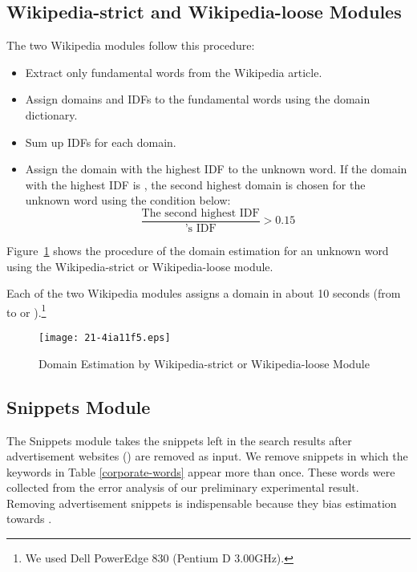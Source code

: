 \documentclass[english]{jnlp_1.4_rep}
\newcommand{\dom}[1]{}
\newcommand{\BAngou}[1]{}
\newcommand{\BANgou}[1]{}
\begin{document}
\subsection{Wikipedia-strict and Wikipedia-loose Modules}
\label{wikipedia}

The two Wikipedia modules follow this procedure:
\begin{itemize}
 \item[\BANgou{1}] Extract only fundamental words from the Wikipedia
	    article.
 \item[\BANgou{2}] Assign domains and IDFs to the fundamental words
	    using the domain dictionary. 
 \item[\BANgou{3}] Sum up IDFs for each domain.
 \item[\BANgou{4}] Assign the domain with the highest IDF to the unknown
	    word. If the domain with the highest IDF is \dom{nodomain},
	    the second highest domain is chosen for the unknown word
	    using the condition below:
    \begin{equation}
     \frac{\text{The second highest IDF}}{\text{\dom{nodomain}'s IDF}}>0.15
    \end{equation}
\end{itemize}

Figure~\ref{fig:Wikipedia-pic} shows the procedure of the domain estimation
for an unknown word using the Wikipedia-strict or Wikipedia-loose module.

Each of the two Wikipedia modules assigns a domain in about 10 seconds
(from \BAngou{1} to \BAngou{2} or \BAngou{3}).\footnote{We
used Dell PowerEdge 830 (Pentium D 3.00GHz).}

\begin{figure}[t]
\begin{center}
\texttt{[image: 21-4ia11f5.eps]}
\end{center}
\caption{Domain Estimation by Wikipedia-strict or Wikipedia-loose Module}
\label{fig:Wikipedia-pic}
\vspace{-0.5\Cvs}
\end{figure}


\subsection{Snippets Module}
\label{snippets}

The Snippets module takes the snippets left in the
search results after advertisement websites (\BAngou{5}) are removed
as input.
We remove snippets in which the keywords in Table \ref{corporate-words}
appear more than once.
These words were collected from the error analysis of our preliminary
experimental result.
Removing advertisement snippets is indispensable
because they bias estimation towards
\dom{business}.
\end{document}
